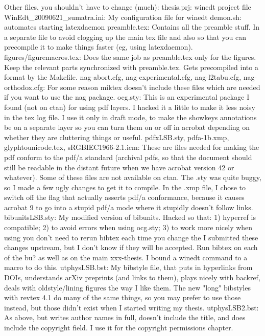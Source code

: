 Other files, you shouldn't have to change (much):
thesis.prj:
    winedt project file
WinEdt_20090621_sumatra.ini:
    My configuration file for winedt
demon.sh:
    automates starting latexdaemon
preamble.tex:
    Contains all the preamble stuff. In a separate file to avoid clogging up the main tex file and also so that you can precompile it to make things faster (eg, using latexdaemon).
figures/figuremacros.tex:
    Does the same job as preamble.tex only for the figures. Keep the relevant parts synchronized with preamble.tex. Gets precompiled into a format by the Makefile.
nag-abort.cfg, nag-experimental.cfg, nag-l2tabu.cfg, nag-orthodox.cfg:
    For some reason miktex doesn't include these files which are needed if you want to use the nag package.
ocg.sty:
    This is an experimental package I found (not on ctan) for using pdf layers. I hacked it a little to make it less noisy in the tex log file. I use it only in draft mode, to make the showkeys annotations be on a separate layer so you can turn them on or off in acrobat depending on whether they are cluttering things or useful.
pdfxLSB.sty, pdfa-1b.xmp, glyphtounicode.tex, sRGBIEC1966-2.1.icm:
    These are files needed for making the pdf conform to the pdf/a standard (archival pdfs, so that the document should still be readable in the distant future when we have acrobat version 42 or whatever). Some of these files are not available on ctan. The .sty was quite buggy, so I made a few ugly changes to get it to compile. In the .xmp file, I chose to switch off the flag that actually asserts pdf/a conformance, because it causes acrobat 9 to go into a stupid pdf/a mode where it stupidly doesn't follow links.
bibunitsLSB.sty:
    My modified version of bibunits. Hacked so that: 1) hyperref is compatible; 2) to avoid errors when using ocg.sty; 3) to work more nicely when using  you don't need to rerun bibtex each time you change the  I submitted these changes upstream, but I don't know if they will be accepted. Run bibtex on each of the bu? as well as on the main xxx-thesis. I bound a winedt command to a macro to do this.
utphysLSB.bst:
    My bibstyle file, that puts in hyperlinks from DOIs, understands arXiv preprints (and links to them), plays nicely with backref, deals with oldstyle/lining figures the way I like them. The new "long" bibstyles with revtex 4.1 do many of the same things, so you may prefer to use those instead, but those didn't exist when I started writing my thesis.
utphysLSB2.bst:
    As above, but writes author names in full, doesn't include the title, and does include the copyright field. I use it for the copyright permissions chapter.
